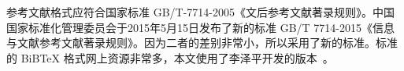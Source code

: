 

参考文献格式应符合国家标准 GB/T-7714-2005《文后参考文献著录规则》。中国国家标准化管理委员会于2015年5月15日发布了新的标准 GB/T 7714-2015《信息与文献参考文献著录规则》。因为二者的差别非常小，所以采用了新的标准。标准的 BiBTeX 格式网上资源非常多，本文使用了李泽平开发的版本~。
